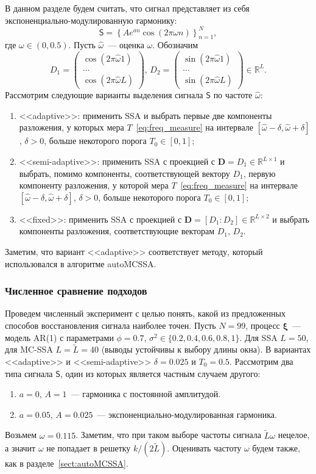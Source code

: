 \documentclass[specialist,
substylefile = spbu_report.rtx,
subf,href,colorlinks=true, 12pt]{disser}
\theoremstyle{definition}
\begin{document}
В данном разделе будем считать, что сигнал представляет из себя экспоненциально-модулированную гармонику:
$$
	\mathsf{S}=\left\{Ae^{a n}\cos(2\pi\omega n)\right\}_{n=1}^N,
$$
где $\omega\in(0, 0.5)$. Пусть $\hat\omega$~--- оценка $\omega$. Обозначим
$$
	D_1=\begin{pmatrix}
		\cos(2\pi\hat\omega 1) \\
		\ldots                 \\
		\cos(2\pi\hat\omega L)
	\end{pmatrix}, \,
	D_2=\begin{pmatrix}
		\sin(2\pi\hat\omega 1) \\
		\ldots                 \\
		\sin(2\pi\hat\omega L)
	\end{pmatrix}\in \mathbb{R}^L.
$$
Рассмотрим следующие варианты выделения сигнала $\mathsf{S}$ по частоте $\hat \omega$:
\begin{enumerate}
	\item <<adaptive>>: применить SSA и выбрать первые две компоненты разложения, у которых мера $T$~\eqref{eq:freq_measure} на интервале $[\hat\omega-\delta, \hat\omega+\delta]$, $\delta>0$, больше некоторого порога $T_0\in[0, 1]$;
	\item  <<semi-adaptive>>: применить SSA с проекцией с $\mathbf{D}=D_1\in \mathbb{R}^{L\times 1}$ и выбрать, помимо компоненты, соответствующей вектору $D_1$, первую компоненту разложения, у которой мера $T$~\eqref{eq:freq_measure} на интервале $[\hat\omega-\delta, \hat\omega+\delta]$, $\delta>0$, больше некоторого порога $T_0\in[0, 1]$;
	\item <<fixed>>: применить SSA с проекцией с $\mathbf{D}=[D_1:D_2]\in\mathbb{R}^{L\times 2}$ и выбрать компоненты разложения, соответствующие векторам $D_1$, $D_2$.
\end{enumerate}
Заметим, что вариант <<adaptive>> соответствует методу, который использовался в алгоритме autoMCSSA.

\subsubsection{Численное сравнение подходов}

Проведем численный эксперимент с целью понять, какой из предложенных способов восстановления сигнала наиболее точен. Пусть $N=99$, процесс $\bm\xi$~--- модель AR(1) с параметрами $\phi=0.7$, $\sigma^2\in\{0.2, 0.4, 0.6, 0.8, 1\}$. Для SSA $L=50$, для MC-SSA $L=\widetilde L=40$ (выводы устойчивы к выбору длины окна). В вариантах <<adaptive>> и <<semi-adaptive>> $\delta=0.025$ и $T_0=0.5$. Рассмотрим два типа сигнала $\mathsf{S}$, один из которых является частным случаем другого:
\begin{enumerate}
	\item $a=0$, $A=1$~--- гармоника с постоянной амплитудой.
	\item $a=0.05$, $A=0.025$~--- экспоненциально-модулированная гармоника.
\end{enumerate}
Возьмем $\omega=0.115$. Заметим, что при таком выборе частоты сигнала $\widetilde L \omega$ нецелое, а значит $\omega$ не попадает в решетку $k/(2\widetilde L)$. Оценивать частоту $\omega$ будем также, как в разделе~\ref{sect:autoMCSSA}.
\end{document}
